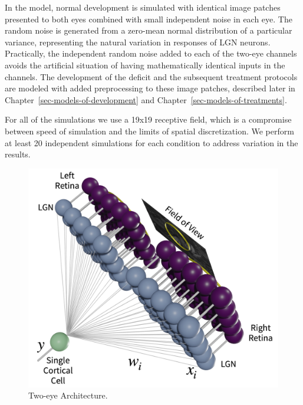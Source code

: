 \documentclass[
  letterpaper,
]{book}
\begin{document}
In the model, normal development is simulated with identical image
patches presented to both eyes combined with small independent noise in
each eye. The random noise is generated from a zero-mean normal
distribution of a particular variance, representing the natural
variation in responses of LGN neurons. Practically, the independent
random noise added to each of the two-eye channels avoids the artificial
situation of having mathematically identical inputs in the channels. The
development of the deficit and the subsequent treatment protocols are
modeled with added preprocessing to these image patches, described later
in Chapter~\ref{sec-models-of-development} and
Chapter~\ref{sec-models-of-treatments}.

For all of the simulations we use a 19x19 receptive field, which is a
compromise between speed of simulation and the limits of spatial
discretization. We perform at least 20 independent simulations for each
condition to address variation in the results.

\begin{figure}

{\centering \includegraphics{./resources/arch.pdf}

}

\caption{\label{fig-arch}Two-eye Architecture.}

\end{figure}
\end{document}

